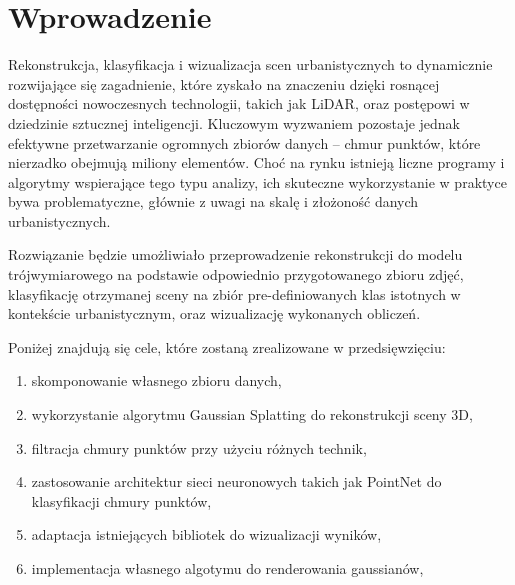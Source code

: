\section{Wprowadzenie}
Rekonstrukcja, klasyfikacja i wizualizacja scen urbanistycznych to dynamicznie rozwijające się zagadnienie, które zyskało na znaczeniu dzięki rosnącej dostępności nowoczesnych technologii, takich jak LiDAR, oraz postępowi w dziedzinie sztucznej inteligencji. Kluczowym wyzwaniem pozostaje jednak efektywne przetwarzanie ogromnych zbiorów danych – chmur punktów, które nierzadko obejmują miliony elementów. Choć na rynku istnieją liczne programy i algorytmy wspierające tego typu analizy, ich skuteczne wykorzystanie w praktyce bywa problematyczne, głównie z uwagi na skalę i złożoność danych urbanistycznych.

Rozwiązanie będzie umożliwiało przeprowadzenie rekonstrukcji do modelu trójwymiarowego na podstawie odpowiednio przygotowanego zbioru zdjęć, klasyfikację otrzymanej sceny na zbiór pre-definiowanych klas istotnych w kontekście urbanistycznym, oraz wizualizację wykonanych obliczeń. 

Poniżej znajdują się cele, które zostaną zrealizowane w przedsięwzięciu:

\begin{enumerate}
    \item skomponowanie własnego zbioru danych, 
    \item wykorzystanie algorytmu Gaussian Splatting do rekonstrukcji sceny 3D,
    \item filtracja chmury punktów przy użyciu różnych technik, 
    \item zastosowanie architektur sieci neuronowych takich jak PointNet do klasyfikacji chmury punktów, 
    \item adaptacja istniejących bibliotek do wizualizacji wyników, 
    \item implementacja własnego algotymu do renderowania gaussianów,
\end{enumerate}